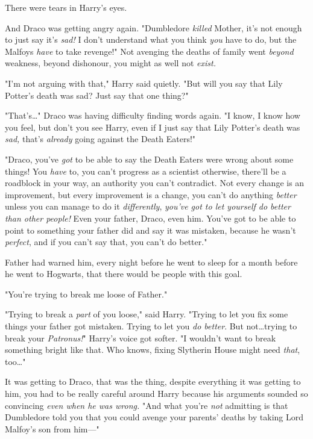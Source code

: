 There were tears in Harry’s eyes.

And Draco was getting angry again. "Dumbledore \emph{killed} Mother, it’s not
enough to just say it’s \emph{sad!} I don’t understand what you think
\emph{you} have to do, but the Malfoys \emph{have} to take revenge!" Not
avenging the deaths of family went \emph{beyond} weakness, beyond dishonour, you
might as well not \emph{exist.}

"I’m not arguing with that," Harry said quietly. "But will you say that Lily
Potter’s death was sad? Just say that one thing?"

"That’s…" Draco was having difficulty finding words again. "I know, I
know how you feel, but don’t you see Harry, even if I just say that Lily
Potter’s death was \emph{sad,} that’s \emph{already} going against the Death
Eaters!"

"Draco, you’ve \emph{got} to be able to say the Death Eaters were wrong about
some things! You \emph{have} to, you can’t progress as a scientist otherwise,
there’ll be a roadblock in your way, an authority you can’t contradict. Not
every change is an improvement, but every improvement is a change, you can’t do
anything \emph{better} unless you can manage to do it \emph{differently},
\emph{you’ve got to let yourself do better than other people!} Even your
father, Draco, even him. You’ve got to be able to point to something your
father did and say it was mistaken, because he wasn’t \emph{perfect}, and if
you can’t say that, you can’t do better."

Father had warned him, every night before he went to sleep for a month before
he went to Hogwarts, that there would be people with this goal.

"You’re trying to break me loose of Father."

"Trying to break a \emph{part} of you loose," said Harry. "Trying to let you
fix some things your father got mistaken. Trying to let you \emph{do better}.
But not…trying to break your \emph{Patronus!}" Harry’s voice got
softer. "I wouldn’t want to break something bright like that. Who knows, fixing
Slytherin House might need \emph{that}, too…"

It was getting to Draco, that was the thing, despite everything it was getting
to him, you had to be really careful around Harry because his arguments sounded
so convincing \emph{even when he was wrong.} "And what you’re \emph{not}
admitting is that Dumbledore told you that you could avenge your parents’
deaths by taking Lord Malfoy’s son from him—"

